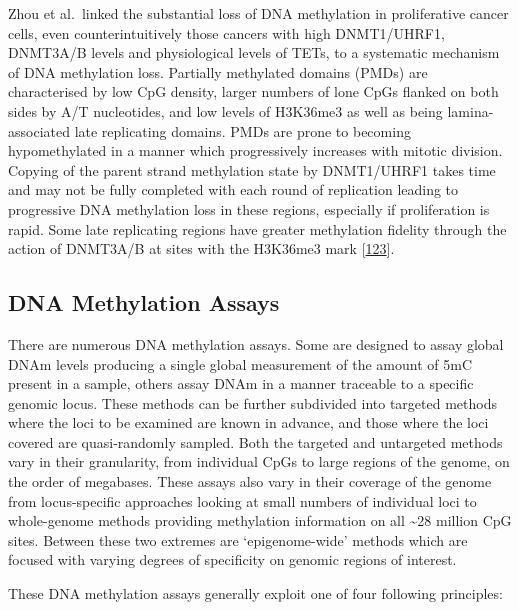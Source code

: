 \documentclass[
]{book}
\begin{document}
Zhou et al.~linked the substantial loss of DNA methylation in proliferative cancer cells, even counterintuitively those cancers with high DNMT1/UHRF1, DNMT3A/B levels and physiological levels of TETs, to a systematic mechanism of DNA methylation loss.
Partially methylated domains (PMDs) are characterised by low CpG density, larger numbers of lone CpGs flanked on both sides by A/T nucleotides, and low levels of H3K36me3 as well as being lamina-associated late replicating domains.
PMDs are prone to becoming hypomethylated in a manner which progressively increases with mitotic division.
Copying of the parent strand methylation state by DNMT1/UHRF1 takes time and may not be fully completed with each round of replication leading to progressive DNA methylation loss in these regions, especially if proliferation is rapid.
Some late replicating regions have greater methylation fidelity through the action of DNMT3A/B at sites with the H3K36me3 mark {[}\protect\hyperlink{ref-Zhou2018}{123}{]}.

\hypertarget{dna-methylation-assays}{%
\subsection{DNA Methylation Assays}\label{dna-methylation-assays}}

There are numerous DNA methylation assays.
Some are designed to assay global DNAm levels producing a single global measurement of the amount of 5mC present in a sample, others assay DNAm in a manner traceable to a specific genomic locus.
These methods can be further subdivided into targeted methods where the loci to be examined are known in advance, and those where the loci covered are quasi-randomly sampled.
Both the targeted and untargeted methods vary in their granularity, from individual CpGs to large regions of the genome, on the order of megabases.
These assays also vary in their coverage of the genome from locus-specific approaches looking at small numbers of individual loci to whole-genome methods providing methylation information on all \textasciitilde28 million CpG sites.
Between these two extremes are `epigenome-wide' methods which are focused with varying degrees of specificity on genomic regions of interest.

These DNA methylation assays generally exploit one of four following principles:
\end{document}
